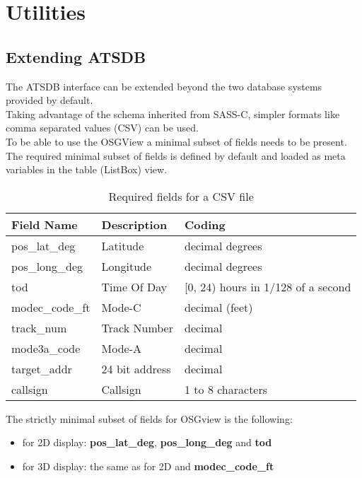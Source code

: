 \chapter{Utilities}
\section{Extending ATSDB}
\label{sec:Extending ATSDB}

The ATSDB interface can be extended beyond the two database systems provided by default. \\

Taking advantage of the schema inherited from SASS-C, simpler formats like comma separated values (CSV) can be used. \\

To be able to use the OSGView a minimal subset of fields needs to be present. The required minimal subset of fields is defined by default and loaded as meta variables in the table (ListBox) view. \\

\begin{table}[H]
  \center
  \begin{tabular}{ | l | l | l |}
    \hline
    \textbf{Field Name} & \textbf{Description} & \textbf{Coding} \\ \hline
    pos\_lat\_deg & Latitude & decimal degrees \\ \hline
    pos\_long\_deg & Longitude & decimal degrees \\ \hline
    tod & Time Of Day & [0, 24) hours in 1/128 of a second \\ \hline
    modec\_code\_ft & Mode-C & decimal (feet) \\ \hline
    track\_num & Track Number & decimal \\ \hline
    mode3a\_code & Mode-A & decimal \\ \hline
    target\_addr & 24 bit address & decimal \\ \hline
    callsign & Callsign & 1 to 8 characters \\ \hline
  \end{tabular}
  \caption{Required fields for a CSV file}
\end{table}

The strictly minimal subset of fields for OSGview is the following:
\begin{itemize}
\item for 2D display: \textbf{pos\_lat\_deg}, \textbf{pos\_long\_deg} and \textbf{tod}
\item for 3D display: the same as for 2D and \textbf{modec\_code\_ft}
\\
\end{itemize}

